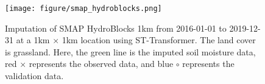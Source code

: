 \documentclass[11pt]{article}
\begin{document}
 
\begin{figure}
\centering
\texttt{[image: figure/smap\_hydroblocks.png]}
\caption{Imputation of SMAP HydroBlocks 1km from 2016-01-01 to 2019-12-31 at a 1km $\times$ 1km location using ST-Transformer. The land cover is grassland. Here, the green line is the imputed soil moisture data, red $\times$ represents the observed data, and blue $\circ$ represents the validation data.}
\label{fig: smap_hydroblock}
\end{figure}





\end{document}
